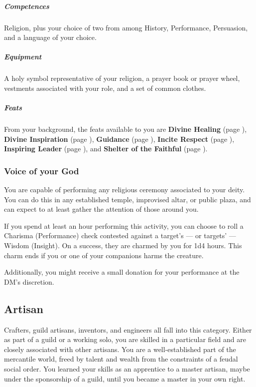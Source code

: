 
    \subparagraph{Competences} Religion, plus your choice of two from among History, Performance, Persuasion, and a language of your choice.

    \subparagraph{Equipment} A holy symbol representative of your religion, a prayer book or prayer wheel, vestments associated with your role, and a set of common clothes.

    \subparagraph{Feats} From your background, the feats available to you are
    \textbf{Divine Healing} (page \pageref{feat::divinehealing}),
    \textbf{Divine Inspiration} (page \pageref{feat::divineinspiration}),
    \textbf{Guidance} (page \pageref{feat::guidance}),
    \textbf{Incite Respect} (page \pageref{feat::inciterespect}),
    \textbf{Inspiring Leader} (page \pageref{feat::inspiringleader}), and
    \textbf{Shelter of the Faithful} (page \pageref{feat::shelterofthefaithful}).

    \subsubsection{Voice of your God} \label{feat::voiceofyourgod}
        You are capable of performing any religious ceremony associated to your deity.
        You can do this in any established temple, improvised altar, or public plaza, and can expect to at least gather the attention of those around you.

        If you spend at least an hour performing this activity, you can choose to roll a Charisma (Performance) check contested against a target's --- or targets' --- Wisdom (Insight).
        On a success, they are charmed by you for 1d4 hours.
        This charm ends if you or one of your companions harms the creature.

        Additionally, you might receive a small donation for your performance at the DM's discretion.

\pagebreak

\subsection*{Artisan} \label{ssec::artisan}
    Crafters, guild artisans, inventors, and engineers all fall into this category.
    Either as part of a guild or a working solo, you are skilled in a particular field and are closely associated with other artisans.
    You are a well-established part of the mercantile world, freed by talent and wealth from the constraints of a feudal social order.
    You learned your skills as an apprentice to a master artisan, maybe under the sponsorship of a guild, until you became a master in your own right.


